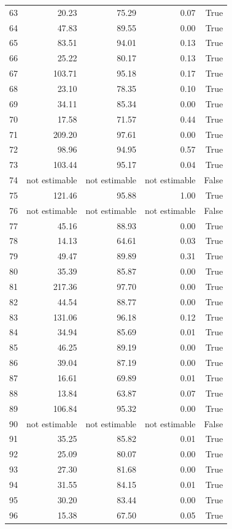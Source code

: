 \begin{longtable}{rrrrr}
63 & 20.23 & 75.29 & 0.07 & True \\
64 & 47.83 & 89.55 & 0.00 & True \\
65 & 83.51 & 94.01 & 0.13 & True \\
66 & 25.22 & 80.17 & 0.13 & True \\
67 & 103.71 & 95.18 & 0.17 & True \\
68 & 23.10 & 78.35 & 0.10 & True \\
69 & 34.11 & 85.34 & 0.00 & True \\
70 & 17.58 & 71.57 & 0.44 & True \\
71 & 209.20 & 97.61 & 0.00 & True \\
72 & 98.96 & 94.95 & 0.57 & True \\
73 & 103.44 & 95.17 & 0.04 & True \\
74 & not estimable & not estimable & not estimable & False \\
75 & 121.46 & 95.88 & 1.00 & True \\
76 & not estimable & not estimable & not estimable & False \\
77 & 45.16 & 88.93 & 0.00 & True \\
78 & 14.13 & 64.61 & 0.03 & True \\
79 & 49.47 & 89.89 & 0.31 & True \\
80 & 35.39 & 85.87 & 0.00 & True \\
81 & 217.36 & 97.70 & 0.00 & True \\
82 & 44.54 & 88.77 & 0.00 & True \\
83 & 131.06 & 96.18 & 0.12 & True \\
84 & 34.94 & 85.69 & 0.01 & True \\
85 & 46.25 & 89.19 & 0.00 & True \\
86 & 39.04 & 87.19 & 0.00 & True \\
87 & 16.61 & 69.89 & 0.01 & True \\
88 & 13.84 & 63.87 & 0.07 & True \\
89 & 106.84 & 95.32 & 0.00 & True \\
90 & not estimable & not estimable & not estimable & False \\
91 & 35.25 & 85.82 & 0.01 & True \\
92 & 25.09 & 80.07 & 0.00 & True \\
93 & 27.30 & 81.68 & 0.00 & True \\
94 & 31.55 & 84.15 & 0.01 & True \\
95 & 30.20 & 83.44 & 0.00 & True \\
96 & 15.38 & 67.50 & 0.05 & True \\

\end{longtable}
